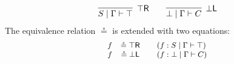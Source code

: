\documentclass[submission,copyright,creativecommons]{eptcs}
\theoremstyle{definition}
\newcommand{\tl}{\otimes \mathsf{L}}
\newcommand{\pass}{\mathsf{pass}}
\newcommand{\unitl}{\mathsf{IL}}
\newcommand{\andlone}{\land \mathsf{L}_{1}}
\newcommand{\andltwo}{\land \mathsf{L}_{2}}
\newcommand{\ax}{\mathsf{ax}}
\newcommand{\ot}{\otimes}
\newcommand{\topr}{\top \mathsf{R}}
\newcommand{\botl}{\bot \mathsf{L}}
\newcommand{\proofbox}[1]{\begin{tabular}{l} #1 \end{tabular}}
\newcommand\cheng[1]{\mbox{}
{\marginpar{\color{blue}CSW}}
{\sf\noindent\color{blue}#1}}%
\begin{document}
\begin{displaymath}
  \begin{array}{c}
    \infer[\topr]{S \mid \Gamma \vdash \top}{}
    \qquad
    \infer[\botl]{\bot \mid \Gamma \vdash C}{}
  \end{array}
\end{displaymath}
The equivalence relation $\circeq$ is extended with two equations:
\begin{equation*}\label{eq:units}
  \small
  \begin{array}{rclll}
    f & \circeq \topr && (f : S \mid \Gamma \vdash \top) \\
    f & \circeq \botl && (f : \bot \mid \Gamma \vdash C)
  \end{array}
\end{equation*}
\end{document}
